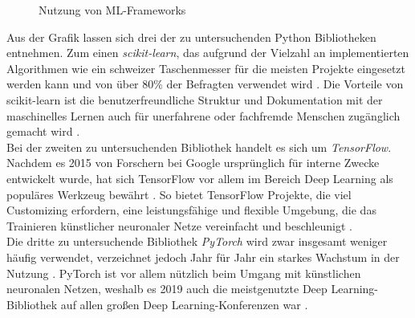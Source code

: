 \documentclass[german,bachelor]{swsLeipzig}
\begin{document}
\begin{figure}[H]
\begin{center}
\caption{Nutzung von ML-Frameworks \cite[]{kaggle}} \label{fig:kaggle}
\end{center}
\end{figure}

Aus der Grafik lassen sich drei der zu untersuchenden Python Bibliotheken entnehmen.
Zum einen \textit{scikit-learn}, das aufgrund der Vielzahl an implementierten Algorithmen wie ein \glqq schweizer Taschenmesser\grqq{}
für die meisten Projekte eingesetzt werden kann und von über 80\% der Befragten verwendet wird \cite[]{kaggle}.
Die Vorteile von scikit-learn ist die benutzerfreundliche Struktur und Dokumentation mit der maschinelles Lernen
auch für unerfahrene oder fachfremde Menschen zugänglich gemacht wird \cite[]{10.1145/2786984.2786995}.\\

Bei der zweiten zu untersuchenden Bibliothek handelt es sich um \textit{TensorFlow}.
Nachdem es 2015 von Forschern bei Google ursprünglich für interne Zwecke entwickelt wurde, hat sich TensorFlow vor allem im Bereich
Deep Learning als populäres Werkzeug bewährt \cite[]{doi:10.3102/1076998619872761}.
So bietet TensorFlow Projekte, die viel Customizing erfordern, eine leistungsfähige und flexible Umgebung, die das Trainieren
künstlicher neuronaler Netze vereinfacht und beschleunigt \cite[]{doi:10.3102/1076998619872761}.\\

Die dritte zu untersuchende Bibliothek \textit{PyTorch} wird zwar insgesamt weniger häufig verwendet, verzeichnet
jedoch Jahr für Jahr ein starkes Wachstum in der Nutzung \cite[]{kaggle}.
PyTorch ist vor allem nützlich beim Umgang mit künstlichen neuronalen Netzen, weshalb es 2019 auch die
meistgenutzte Deep Learning-Bibliothek auf allen großen Deep Learning-Konferenzen war \cite[]{2020}.\\
\end{document}
